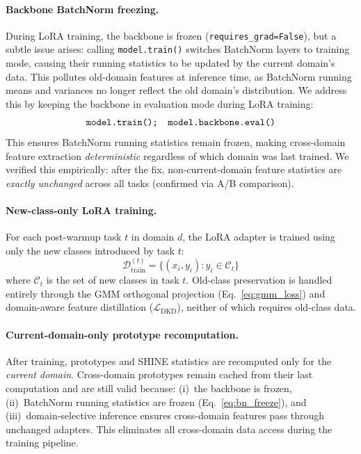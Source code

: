 \paragraph{Backbone BatchNorm freezing.}
\label{sec:bn_freeze}
During LoRA training, the backbone is frozen (\texttt{requires\_grad=False}), but a subtle issue arises: calling \texttt{model.train()} switches BatchNorm layers to training mode, causing their running statistics to be updated by the current domain's data.
This pollutes old-domain features at inference time, as BatchNorm running means and variances no longer reflect the old domain's distribution.
We address this by keeping the backbone in evaluation mode during LoRA training:
\begin{equation}
    \texttt{model.train();\quad model.backbone.eval()}
\label{eq:bn_freeze}
\end{equation}
This ensures BatchNorm running statistics remain frozen, making cross-domain feature extraction \emph{deterministic} regardless of which domain was last trained.
We verified this empirically: after the fix, non-current-domain feature statistics are \emph{exactly unchanged} across all tasks (confirmed via A/B comparison).

\paragraph{New-class-only LoRA training.}
For each post-warmup task $t$ in domain $d$, the LoRA adapter is trained using only the new classes introduced by task $t$:
\begin{equation}
    \mathcal{D}_{\mathrm{train}}^{(t)} = \{(x_i, y_i) : y_i \in \mathcal{C}_t\}
\end{equation}
where $\mathcal{C}_t$ is the set of new classes in task $t$.
Old-class preservation is handled entirely through the GMM orthogonal projection (Eq.~\ref{eq:gmm_loss}) and domain-aware feature distillation ($\mathcal{L}_{\mathrm{DKD}}$), neither of which requires old-class data.

\paragraph{Current-domain-only prototype recomputation.}
After training, prototypes and SHINE statistics are recomputed only for the \emph{current domain}.
Cross-domain prototypes remain cached from their last computation and are still valid because:
(i)~the backbone is frozen,
(ii)~BatchNorm running statistics are frozen (Eq.~\ref{eq:bn_freeze}), and
(iii)~domain-selective inference ensures cross-domain features pass through unchanged adapters.
This eliminates all cross-domain data access during the training pipeline.


